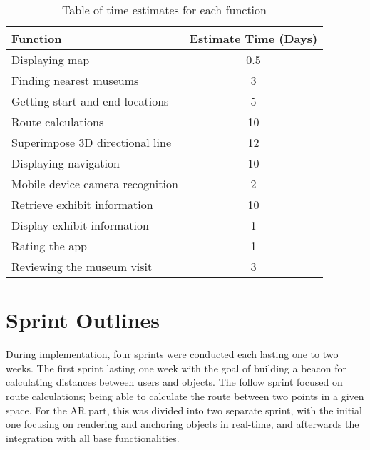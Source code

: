\begingroup
\renewcommand{\arraystretch}{1.5} %
\begin{table}[H]
\centering
\begin{tabular}{l|c}
\textbf{Function}                & \textbf{Estimate Time (Days)} \\ \hline
Displaying map                   & 0.5                           \\
Finding nearest museums          & 3                             \\
Getting start and end locations  & 5                             \\
Route calculations               & 10                            \\
Superimpose 3D directional line  & 12                            \\
Displaying navigation            & 10                            \\
Mobile device camera recognition & 2                             \\
Retrieve exhibit information     & 10                            \\
Display exhibit information      & 1                             \\
Rating the app                   & 1                             \\
Reviewing the museum visit       & 3                             
\end{tabular}
\caption{Table of time estimates for each function}
\label{table:timeestimates}
\end{table}
\endgroup

\section{Sprint Outlines}
During implementation, four sprints were conducted each lasting one to two weeks. The first sprint lasting one week with the goal of building a beacon for calculating distances between users and objects. The follow sprint focused on route calculations; being able to calculate the route between two points in a given space. For the AR part, this was divided into two separate sprint, with the initial one focusing on rendering and anchoring objects in real-time, and afterwards the integration with all base functionalities.

